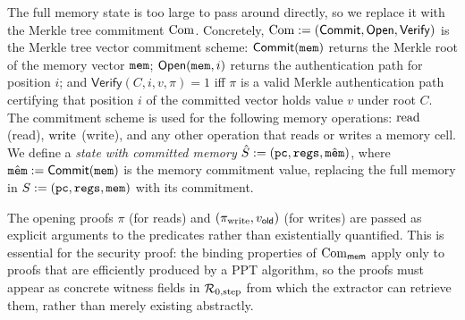 The full memory state is too large to pass around directly,
so we replace it with the Merkle tree commitment $\mathrm{Com}$.
Concretely, $\mathrm{Com} := (\mathsf{Commit}, \mathsf{Open}, \mathsf{Verify})$ is the Merkle tree
vector commitment scheme: $\mathsf{Commit}(\mathtt{mem})$ returns the Merkle root of the memory
vector $\mathtt{mem}$; $\mathsf{Open}(\mathtt{mem}, i)$ returns the authentication path for position $i$;
and $\mathsf{Verify}(C, i, v, \pi) = 1$ iff $\pi$ is a valid Merkle authentication path
certifying that position $i$ of the committed vector holds value $v$ under root $C$.
The commitment scheme is used for the following memory operations:
$\mathrm{read}$ (read), $\mathrm{write}$ (write), and any other operation that reads
or writes a memory cell.
We define a \emph{state with committed memory} $\hat{S}:=(\mathtt{pc},\mathtt{regs},\hat{\mathtt{mem}})$, where $\hat{\mathtt{mem}}:=\mathsf{Commit}(\mathtt{mem})$ is the memory commitment value,
replacing the full memory in $S:=(\mathtt{pc},\mathtt{regs},\mathtt{mem})$ with its commitment.

The opening proofs $\pi$ (for reads) and $(\pi_{\mathrm{write}},v_{\mathsf{old}})$ (for writes)
are passed as explicit arguments to the predicates rather than existentially quantified.
This is essential for the security proof: the binding properties of $\mathrm{Com}_{\mathsf{mem}}$
apply only to proofs that are efficiently produced by a PPT algorithm, so the proofs must
appear as concrete witness fields in $\mathcal{R}_{0,\mathrm{step}}$ from which the extractor can
retrieve them, rather than merely existing abstractly.


